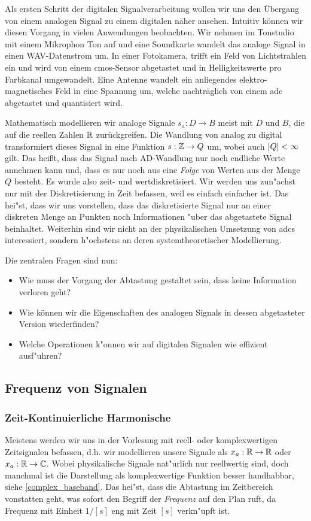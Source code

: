%
Als ersten Schritt der digitalen Signalverarbeitung wollen wir uns den \"Ubergang von einem analogen Signal zu einem digitalen n\"aher ansehen.
Intuitiv k\"onnen wir diesen Vorgang in vielen Anwendungen beobachten.
Wir nehmen im Tonstudio mit einem Mikrophon Ton auf und eine Soundkarte wandelt das analoge Signal in einen WAV-Datenstrom um.
In einer Fotokamera, trifft ein Feld von Lichtstrahlen ein und wird von einem \gls{cmos}-Sensor  abgetastet und in Helligkeitswerte pro Farbkanal umgewandelt.
Eine Antenne wandelt ein anliegendes elektro-magnetisches Feld in eine Spannung um, welche nachtr\"aglich von einem \gls{adc} abgetastet und quantisiert wird.

Mathematisch modellieren wir analoge Signale $s_a : D \rightarrow B$ meist mit $D$ und $B$, die auf die reellen Zahlen $\mathbb{R}$ zur\"uckgreifen.
Die Wandlung von analog zu digital transformiert dieses Signal in eine Funktion $s: \mathbb{Z} \rightarrow Q$ um, wobei auch ${\left| Q \right|} < \infty$ gilt.
Das hei\ss{}t, dass das Signal nach AD-Wandlung nur noch endliche Werte annehmen kann und, dass es nur noch aus eine \emph{Folge} von Werten aus der Menge $Q$ besteht. 
Es wurde also zeit- und wertdiskretisiert.
Wir werden uns zun"achst nur mit der Diskretisierung in Zeit befassen, weil es einfach einfacher ist.
Das hei"st, dass wir uns vorstellen, dass das diskretisierte Signal nur an einer diskreten Menge an Punkten noch Informationen "uber das abgetastete Signal beinhaltet.
Weiterhin sind wir nicht an der physikalischen Umsetzung von \glspl{adc} interessiert, sondern h"ochstens an deren systemtheoretischer Modellierung.

Die zentralen Fragen sind nun:
\begin{itemize}
    \item Wie muss der Vorgang der Abtastung gestaltet sein, dass keine Information verloren geht?
    \item Wie k\"onnen wir die Eigenschaften des analogen Signals in dessen abgetasteter Version wiederfinden?
    \item Welche Operationen k"onnen wir auf digitalen Signalen wie effizient ausf"uhren?
\end{itemize}
%
\subsection{Frequenz von Signalen}
%
\subsubsection{Zeit-Kontinuierliche Harmonische}
%
Meistens werden wir uns in der Vorlesung mit reell- oder komplexwertigen Zeitsignalen befassen, d.h. wir modellieren unsere Signale als $x_a : \mathbb{R} \rightarrow \mathbb{R}$ oder $x_a: \mathbb{R} \rightarrow \mathbb{C}$.
Wobei physikalische Signale nat"urlich nur reellwertig sind, doch manchmal ist die Darstellung als komplexwertige Funktion besser handhabbar, siehe \eqref{complex_baseband}.
Das hei"st, dass die Abtastung im Zeitbereich vonstatten geht, was sofort den Begriff der \emph{Frequenz} auf den Plan ruft, da Frequenz mit Einheit $1/[s]$ eng mit Zeit $[s]$ verkn"upft ist.

